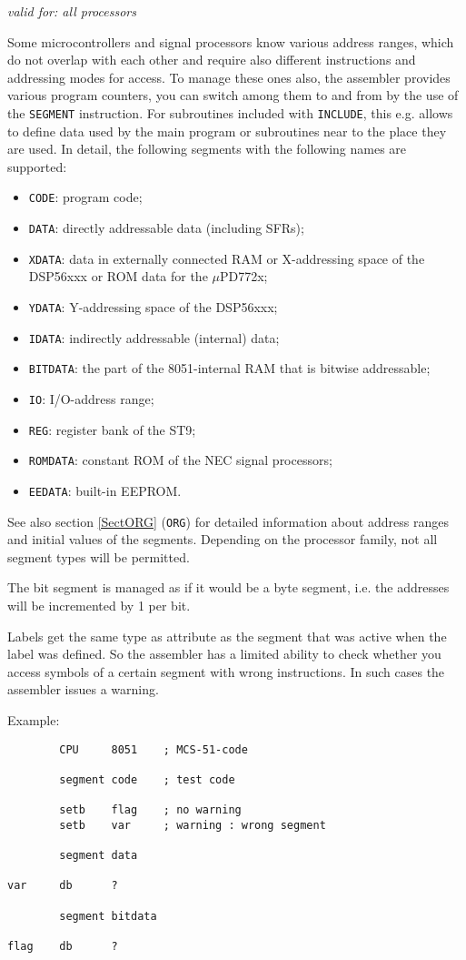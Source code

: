 \documentclass[12pt,twoside]{report}
\newcommand{\tty}[1]{{\tt #1}}
\begin{document}
{\em valid for: all processors}

Some microcontrollers and signal processors know various address ranges,
which do not overlap with each other and require also different
instructions and addressing modes for access.  To manage these ones also,
the assembler provides various program counters, you can switch among
them to and from by the use of the \tty{SEGMENT} instruction.  For subroutines
included with \tty{INCLUDE}, this e.g. allows to define data used by the
main program or subroutines near to the place they are used.  In detail,
the following segments with the following names are supported:
\begin{itemize}
\item{\tty{CODE}: program code;}
\item{\tty{DATA}: directly addressable data (including SFRs);}
\item{\tty{XDATA}: data in externally connected RAM or
      X-addressing space of the DSP56xxx or ROM data for the $\mu$PD772x;}
\item{\tty{YDATA}: Y-addressing space of the DSP56xxx;}
\item{\tty{IDATA}: indirectly addressable (internal) data; }
\item{\tty{BITDATA}: the part of the 8051-internal RAM that is bitwise
      addressable;}
\item{\tty{IO}: I/O-address range;}
\item{\tty{REG}: register bank of the ST9;}
\item{\tty{ROMDATA}: constant ROM of the NEC signal processors;}
\item{\tty{EEDATA}: built-in EEPROM.}
\end{itemize}
See also section \ref{SectORG} (\tty{ORG}) for detailed information about
address ranges and initial values of the segments. Depending on the
processor family, not all segment types will be permitted.

The bit segment is managed as if it would be a byte segment, i.e. the
addresses will be incremented by 1 per bit.

Labels get the same type as attribute as the segment that was active
when the label was defined.  So the assembler has a limited ability
to check whether you access symbols of a certain segment with wrong
instructions.  In such cases the assembler issues a warning.

Example:
\begin{verbatim}
        CPU     8051    ; MCS-51-code

        segment code    ; test code

        setb    flag    ; no warning
        setb    var     ; warning : wrong segment

        segment data

var     db      ?

        segment bitdata

flag    db      ?
\end{verbatim}
\end{document}
